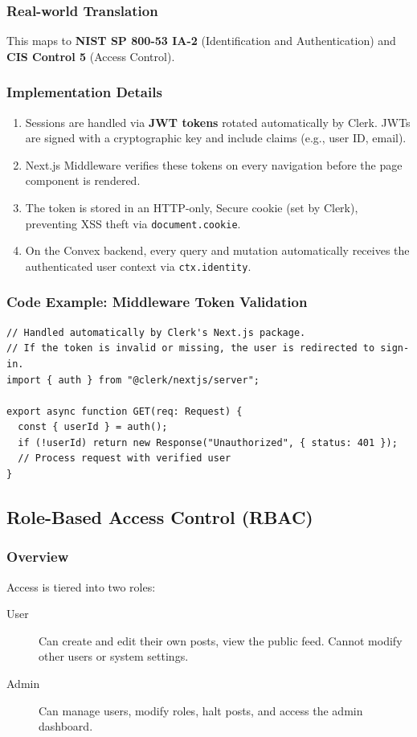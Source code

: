\documentclass[11pt,a4paper]{article}
\begin{document}
\subsubsection{Real-world Translation}
This maps to \textbf{NIST SP 800-53 IA-2} (Identification and Authentication) and \textbf{CIS Control 5} (Access Control).

\subsubsection{Implementation Details}
\begin{enumerate}
    \item Sessions are handled via \textbf{JWT tokens} rotated automatically by Clerk. JWTs are signed with a cryptographic key and include claims (e.g., user ID, email).
    \item Next.js Middleware verifies these tokens on every navigation before the page component is rendered.
    \item The token is stored in an HTTP-only, Secure cookie (set by Clerk), preventing XSS theft via \texttt{document.cookie}.
    \item On the Convex backend, every query and mutation automatically receives the authenticated user context via \texttt{ctx.identity}.
\end{enumerate}

\subsubsection{Code Example: Middleware Token Validation}
\begin{lstlisting}
// Handled automatically by Clerk's Next.js package.
// If the token is invalid or missing, the user is redirected to sign-in.
import { auth } from "@clerk/nextjs/server";

export async function GET(req: Request) {
  const { userId } = auth();
  if (!userId) return new Response("Unauthorized", { status: 401 });
  // Process request with verified user
}
\end{lstlisting}

\subsection{Role-Based Access Control (RBAC)}

\subsubsection{Overview}
Access is tiered into two roles:
\begin{description}
    \item[User] Can create and edit their own posts, view the public feed. Cannot modify other users or system settings.
    \item[Admin] Can manage users, modify roles, halt posts, and access the admin dashboard.
\end{description}
\end{document}
